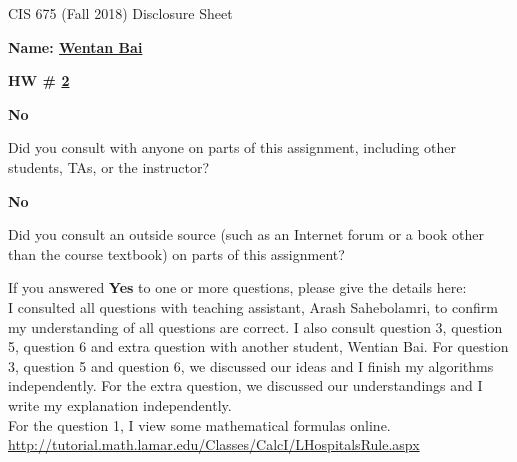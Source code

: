 \documentclass[12pt]{article}
\newcommand*\circled[1]{\tikz[baseline=(char.base)]{
            \node[shape=circle,draw,inner sep=2pt] (char) {#1};}}
\begin{document}
\begin{center}
  \Large
  CIS 675 (Fall 2018) Disclosure Sheet 
\end{center} 
\vspace*{2em}

\noindent
\textbf{\Large Name: \underline{ Wentan Bai }} 


\noindent 
\begin{minipage}[t]{1.0\linewidth}

\begin{minipage}[t]{0.25\linewidth}
\textbf{\Large
  HW \# \underline{ 2 }
} 

\end{minipage} \vspace*{3ex}




\begin{minipage}[t]{.8in}
  \textbf{\circled{Yes} \quad No}
\end{minipage}
\qquad 
\begin{minipage}[t]{5.5in}
  Did you consult with anyone on parts of this assignment, including other students, TAs, or the instructor? 
\end{minipage}
\vspace*{1ex}

\begin{minipage}[t]{.8in}
  \textbf{\circled{Yes} \quad No}
\end{minipage}
\qquad 
\begin{minipage}[t]{5.5in}
  Did you consult an outside source (such as an Internet forum or a
  book other than the course textbook) on parts of this assignment? 
\end{minipage}
\vspace*{1ex}

\noindent
  If you answered \textbf{Yes} to one or more questions, please give the details here: \vspace*{5ex} \\
  I consulted all questions with teaching assistant, Arash Sahebolamri, to confirm my understanding of all questions are correct. 
  I also consult question 3, question 5, question 6 and extra question with another student, Wentian Bai. For question 3, question 5 and question 6, we discussed our ideas and I finish my algorithms independently. 
  For the extra question, we discussed our understandings and I write my explanation independently.  \vspace*{5ex} \\

  For the question 1, I view some mathematical formulas online. \\ \href{url}{http://tutorial.math.lamar.edu/Classes/CalcI/LHospitalsRule.aspx}


\vfill
\end{minipage}
\end{document}
